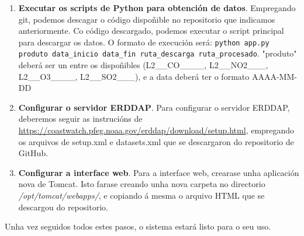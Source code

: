 \begin{enumerate}
\begin{lstlisting}
    [Service]
    Type=forking

    User=tomcat
    Group=tomcat

    Environment="JAVA_HOME=/usr/lib/jvm/java-1.11.0-openjdk-amd64"
    Environment="JAVA_OPTS=-Djava.security.egd=file:///dev/urandom"
    Environment="CATALINA_BASE=/opt/tomcat"
    Environment="CATALINA_HOME=/opt/tomcat"
    Environment="CATALINA_PID=/opt/tomcat/temp/tomcat.pid"
    Environment="CATALINA_OPTS=-Xms512M -Xmx1024M -server -XX:+UseParallelGC"

    ExecStart=/opt/tomcat/bin/startup.sh
    ExecStop=/opt/tomcat/bin/shutdown.sh

    RestartSec=10
    Restart=always

    [Install]
    WantedBy=multi-user.target
    \end{lstlisting}
    A continuación, recargarase o \textit{systemctl} con \texttt{sudo systemctl daemon-reload} e arrancarase o servizo de Tomcat con \texttt{sudo systemctl start tomcat}. Configurarase Tomcat para
    que arranque co sistema, mediante o comando \texttt{sudo systemctl enable tomcat}. Por último, executarase \texttt{sudo ufw allow 8080} para permitir tráfico polo porto 8080.
    \item \textbf{Executar os scripts de Python para obtención de datos}. Empregando git, podemos descagar o código dispoñible no repositorio que indicamos anteriormente. Co código descargado, 
    podemos executar o script principal para descargar os datos. O formato de execución será: \texttt{python app.py produto data\_inicio data\_fin ruta\_descarga ruta\_procesado}. "produto" deberá
    ser un entre os dispoñibles (L2\_\_CO\_\_\_\_, L2\_\_NO2\_\_\_, L2\_\_O3\_\_\_\_, L2\_\_SO2\_\_\_), e a data deberá ter o formato AAAA-MM-DD
    \item \textbf{Configurar o servidor ERDDAP}. Para configurar o servidor ERDDAP, deberemos seguir as instrucións de \url{https://coastwatch.pfeg.noaa.gov/erddap/download/setup.html}, empregando
    os arquivos de setup.xml e datasets.xml que se descargaron do repositorio de GitHub.
    \item \textbf{Configurar a interface web}. Para a interface web, crearase unha aplicación nova de Tomcat. Isto farase creando unha nova carpeta no directorio \textit{/opt/tomcat/webapps/}, e
    copiando á mesma o arquivo HTML que se descargou do repositorio.
\end{enumerate}

Unha vez seguidos todos estes pasos, o sistema estará listo para o seu uso.

